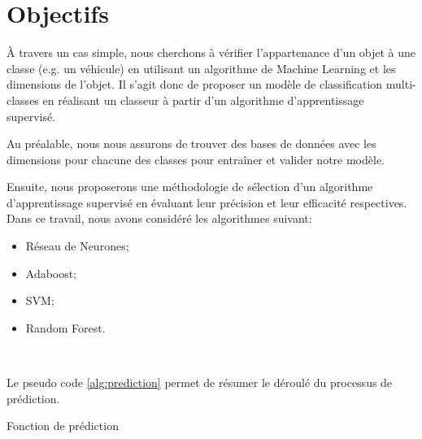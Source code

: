 \documentclass[a4paper]{report}
\begin{document}
\section{Objectifs}

À travers un cas simple, nous cherchons à vérifier l'appartenance d'un objet à une classe (e.g. un véhicule) en utilisant un algorithme de Machine Learning et les dimensions de l'objet. Il s'agit donc de proposer un modèle de classification multi-classes en réalisant un classeur à partir d'un algorithme d'apprentissage supervisé.

Au préalable, nous nous assurons de trouver des bases de données avec les dimensions pour chacune des classes pour entraîner et valider notre modèle. 

Ensuite, nous proposerons une méthodologie de sélection d'un algorithme d'apprentissage supervisé en évaluant leur précision et leur efficacité respectives. Dans ce travail, nous avons considéré les algorithmes suivant: 

\begin{itemize}
\label{classifiers}
\item Réseau de Neurones;
\item Adaboost;
\item SVM;
\item Random Forest.
\end{itemize}

~\par

\noindent Le pseudo code \ref{alg:prediction} permet de résumer le déroulé du processus de prédiction.

\begin{algorithm}[h]
\SetAlgoLined

\medbreak


\medbreak


\medbreak

\caption{Fonction de prédiction\label{alg:prediction}}
\end{algorithm}
\end{document}
